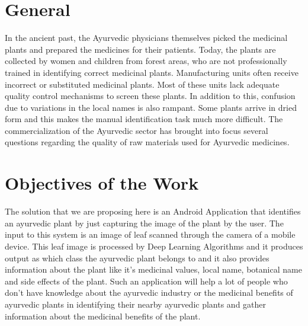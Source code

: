 \section{General}    %

In the ancient past, the Ayurvedic physicians themselves picked the medicinal plants and prepared the medicines for their patients. Today, the plants are collected by women and children from forest areas, who are not professionally trained in identifying correct medicinal plants. Manufacturing units often receive incorrect or substituted medicinal plants. Most of these units lack adequate quality control mechanisms to screen these plants. In addition to this, confusion due to variations in the local names is also rampant. Some plants arrive in dried form and this makes the manual identification task much more difficult. The commercialization of the Ayurvedic sector has brought into focus several questions regarding the quality of raw materials used for Ayurvedic medicines.
\pagebreak


\section{Objectives of the Work}

The solution that we are proposing here is an Android Application that identifies an ayurvedic plant by just capturing the image of the plant by the user. The input to this system is an image of leaf scanned through the camera of a mobile device. This leaf image is processed by Deep Learning Algorithms and it produces output as which class the ayurvedic plant belongs to and it also provides information about the plant like it's medicinal values, local name, botanical name and side effects of the plant.
Such an application will help a lot of people who don't have knowledge about the ayurvedic industry or the medicinal benefits of ayurvedic plants in identifying their nearby ayurvedic plants and gather information about the medicinal benefits of the plant.






